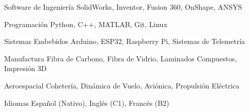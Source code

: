\cvsection{\SkillsLabel}

\cvskill
{Software de Ingeniería}
{SolidWorks, Inventor, Fusion 360, OnShape, ANSYS}

\cvskill
{Programación}
{Python, C++, MATLAB, Git, Linux}

\cvskill
{Sistemas Embebidos}
{Arduino, ESP32, Raspberry Pi, Sistemas de Telemetría}

\cvskill
{Manufactura}
{Fibra de Carbono, Fibra de Vidrio, Laminados Compuestos, Impresión 3D}

\cvskill
{Aeroespacial}
{Cohetería, Dinámica de Vuelo, Aviónica, Propulsión Eléctrica}

\cvskill
{Idiomas}
{Español (Nativo), Inglés (C1), Francés (B2)}

